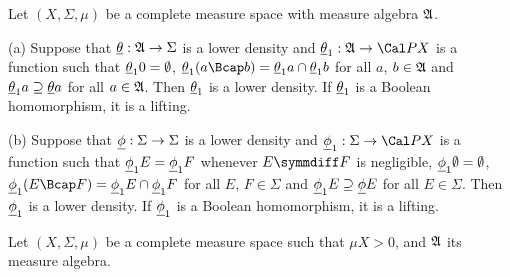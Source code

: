  Let $(X,\Sigma,\mu)$ be a complete measure space
with
measure algebra $\frak A$.

(a) Suppose that $\underline{\theta}:\frak A\to\Sigma$ is a lower density and
$\undtheta_1:\frak A\to\Cal PX$ is a function such that
$\underline{\theta}_10=\emptyset$,
$\undtheta_1(a\Bcap b)=\undtheta_1a\cap\undtheta_1b$ for all
$a$, $b\in\frak A$ and $\underline{\theta}_1a\supseteq\underline{\theta} a$ for all
$a\in\frak A$.   Then $\underline{\theta}_1$ is a lower density.   If
$\underline{\theta}_1$
is a Boolean homomorphism, it is a lifting.

(b) Suppose that ${\underline{\phi}}:\Sigma\to\Sigma$ is a lower density and
$\undphi_1:\Sigma\to\Cal PX$ is a function such that
${\underline{\phi}}_1E={\underline{\phi}}_1F$ whenever $E\symmdiff F$ is negligible,
${\underline{\phi}}_1\emptyset=\emptyset$,
$\undphi_1(E\Bcap F)=\undphi_1E\cap\undphi_1F$ for all
$E$, $F\in\Sigma$ and ${\underline{\phi}}_1E\supseteq{\underline{\phi}} E$ for all
$E\in\Sigma$.
Then ${\underline{\phi}}_1$ is a lower density.   If ${\underline{\phi}}_1$ is a Boolean
homomorphism, it is a lifting.


 Let $(X,\Sigma,\mu)$ be a complete
measure space such that $\mu X>0$, and $\frak A$ its measure algebra.

